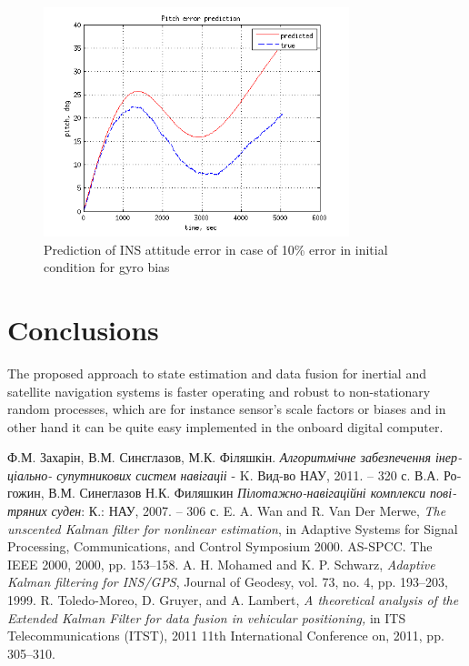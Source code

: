 \documentclass[conference, utf8]{IEEEtran}
\begin{document}
\begin{figure}[!t]
  \centering
  \includegraphics[width=3.5in]{theta_err_2}
  \caption{Prediction of  INS attitude error in case of 10\% error in initial condition for gyro bias}
  \label{fig:theta_err2}
\end{figure}

\section{Conclusions}
The proposed approach to state estimation and data fusion for inertial and 
satellite navigation systems is faster operating and robust to non-stationary
random processes, which are for instance sensor's scale factors or biases and 
in other hand it can be quite easy implemented in the onboard digital computer.

\begin{thebibliography}{1}

  \foreignlanguage{ukrainian}
{Ф.М. Захарін, В.М. Синєглазов, М.К. Філяшкін. \emph{Алгоритмічне забезпечення інерціально- супутникових систем навігаціі} - K. \:Вид-во НАУ, 2011. – 320 с.}
 \foreignlanguage{ukrainian}{В.А. Рогожин, В.М. Синеглазов Н.К. Филяшкин 
\emph{Пілотажно-навігаційні комплекси повітряних суден}: К.: НАУ, 2007. – 306 с.}
E. A. Wan and R. Van Der Merwe, 
\emph{The unscented Kalman filter for nonlinear estimation}, in Adaptive Systems for Signal Processing, Communications, and Control Symposium 2000. AS-SPCC. The IEEE 2000, 2000, pp. 153–158.
A. H. Mohamed and K. P. Schwarz, 
\emph{Adaptive Kalman filtering for INS/GPS}, Journal of Geodesy, vol. 73, no. 4, pp. 193–203, 1999.
R. Toledo-Moreo, D. Gruyer, and A. Lambert, 
\emph{A theoretical analysis of the Extended Kalman Filter for data fusion in vehicular positioning,} in ITS Telecommunications (ITST), 2011 11th International Conference on, 2011, pp. 305–310.


\end{thebibliography}




\end{document}
